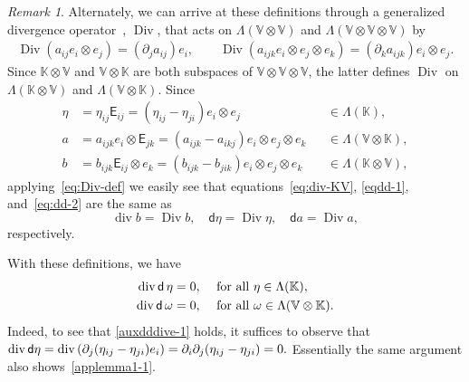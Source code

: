 \documentclass[12pt]{amsart}
\numberwithin{equation}{section}
\DeclareMathOperator{\divg}{div}
\DeclareMathOperator{\Div}{Div}
\theoremstyle{definition}
\theoremstyle{remark}
\newtheorem{remark}[theorem]{Remark}
\newcommand{\V}{\mathbb{V}}
\newcommand{\K}{\mathbb{K}}
\renewcommand{\(}{\bigl(}
\renewcommand{\)}{\bigr)}
\newcommand{\EK}{\mathsf{E}}
\newcommand{\dd}{\mathsf{d}}
\newcommand{\dive}{{\ensuremath\mathop{\mathrm{div}\,}}} %
\begin{document}
\begin{remark}
  Alternately, we can arrive at these definitions through a generalized
  divergence operator~\cite{MarsdHughe94}, $\Div$, that acts on
  $\Lambda(\V \otimes \V)$ and $\Lambda (\V \otimes \V \otimes \V)$ by
  \begin{gather}
    \label{eq:Div-def}
    \Div (a_{ij} e_i \otimes e_j) = (\partial_j a_{ij} ) e_i,
    \qquad
    \Div (a_{ijk} e_i \otimes e_j \otimes e_k) =
    (\partial_k a_{ijk} ) e_i\otimes e_j.
  \end{gather}
  Since $\K \otimes \V$ and $\V \otimes \K$ are both subspaces of
  $\V \otimes \V \otimes \V$, the latter defines $\Div$ on
  $\Lambda(\K \otimes \V)$ and $\Lambda(\V \otimes \K)$.  Since 
  \begin{align*}
    \eta
    & = \eta_{ij} \EK_{ij} = (\eta_{ij} - \eta_{ji}) e_i \otimes e_j
      && \in \Lambda(\K),
    \\
    a & = a_{ijk} e_i \otimes \EK_{jk} = (a_{ijk} - a_{ikj}) e_i \otimes
       e_j \otimes e_k && \in \Lambda( \V \otimes \K),
    \\
    b &  = b_{ijk} \EK_{ij} \otimes e_k = (b_{ijk} - b_{jik} ) e_i \otimes
        e_j \otimes e_k && \in \Lambda( \K \otimes \V),   
  \end{align*}
  applying~\eqref{eq:Div-def}  we easily see that
  equations~\eqref{eq:div-KV}, \eqref{eqdd-1}, and~\eqref{eq:dd-2} are
  the same as
  \[
    \divg b = \Div b, \quad 
    \dd \eta = \Div \eta, \quad 
    \dd a = \Div a,
  \]
  respectively.   
\end{remark}



With these definitions,  we have
\begin{align}
  \label{auxdddive-1}
 \dive  \dd\, \eta & =0,  && {\text{ for all }} \eta \in \Lambda(\K),  
  \\
  \label{applemma1-1}
  \dive \dd \, \omega & =  0,
  && {\text{ for all }} \omega \in \Lambda(\V \otimes \K).
\end{align}
Indeed, to see that \eqref{auxdddive-1} holds, 
it suffices to observe that
$\dive \dd \eta = \dive (\partial_{j} (\eta_{ij} -\eta_{ji}) e_i)=
\partial_{i}\partial_{j} (\eta_{ij} -\eta_{ji}) =0. $ Essentially the
same argument also shows~\eqref{applemma1-1}.
\end{document}
